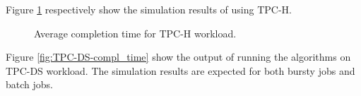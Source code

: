 Figure \ref{fig:TPC-H-compl_time} respectively show the simulation results of using TPC-H.

\begin{figure}[!t]
	\centering
	\caption{Average completion time for TPC-H workload.}
	\label{fig:TPC-H-compl_time}
\end{figure}

Figure \ref{fig:TPC-DS-compl_time} show the output of running the algorithms on TPC-DS workload. The simulation results are expected for both bursty jobs and batch jobs.

